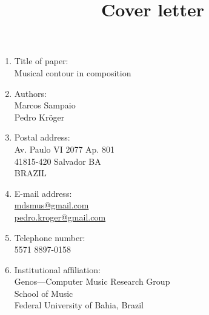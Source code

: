 \documentclass[12pt]{article}
\begin{document}
\title{Cover letter}
\date{}

\maketitle

\thispagestyle{empty}

\begin{enumerate}
\item Title of paper: \\
  Musical contour in composition
\item Authors: \\
  Marcos Sampaio \\
  Pedro Kröger
\item Postal address: \\
  Av. Paulo VI 2077 Ap. 801 \\
  41815-420 Salvador BA \\
  BRAZIL
\item E-mail address: \\
  \url{mdsmus@gmail.com} \\
  \url{pedro.kroger@gmail.com}
\item Telephone number: \\
  5571 8897-0158
\item Institutional affiliation: \\
  Genos---Computer Music Research Group \\
  School of Music \\
  Federal University of Bahia, Brazil
\end{enumerate}
\end{document}
